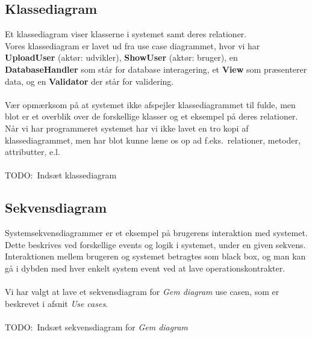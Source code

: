 \subsection{Klassediagram}
Et klassediagram viser klasserne i systemet samt deres relationer.\\
Vores klassediagram er lavet ud fra use case diagrammet, hvor vi har \textbf{UploadUser} (aktør: udvikler), \textbf{ShowUser} (aktør: bruger), en \textbf{DatabaseHandler} som står for database interagering, et \textbf{View} som præsenterer data, og en \textbf{Validator} der står for validering.
\\\\
Vær opmærksom på at systemet ikke afspejler klassediagrammet til fulde, men blot er et overblik over de forskellige klasser og et eksempel på deres relationer.
Når vi har programmeret systemet har vi ikke lavet en tro kopi af klassediagrammet, men har blot kunne læne os op ad f.eks.\
relationer, metoder, attributter, e.l.
\\\\
TODO:\ Indsæt klassediagram
\subsection{Sekvensdiagram}
Systemsekvensdiagrammer er et eksempel på brugerens interaktion med systemet. Dette beskrives ved forskellige events og logik i systemet, under en given sekvens.
\\
Interaktionen mellem brugeren og systemet betragtes som black box, og man kan gå i dybden med hver enkelt system event ved at lave operationskontrakter.
\\\\
Vi har valgt at lave et sekvensdiagram for \textit{Gem diagram} use casen, som er beskrevet i afsnit \textit{Use cases}.
\\\\
TODO:\ Indsæt sekvensdiagram for \textit{Gem diagram}
